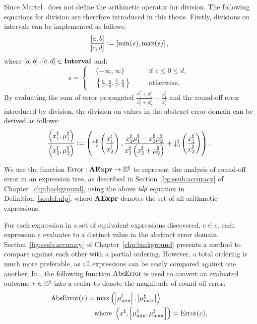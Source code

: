 Since Martel~\cite{martel07} does not define the arithmetic operator for
division.  The following equations for division are therefore introduced in
this thesis.  Firstly, divisions on intervals can be implemented as follows:
\begin{equation}
    \frac{\left[{a}, {b}\right]}{\left[{c}, {d}\right]}
        \vcentcolon= \left[{\min(s)}, {\max(s)}\right],
\end{equation}
where $\left[{a}, {b}\right], \left[{c}, {d}\right] \in \mathbf{Interval}$ and:
\begin{equation}
    s = \left\{
    \begin{aligned}
        & \{ -\infty, \infty \}
            && \text{if~} c \leq 0 \leq d, \\
        & \left\{
            \frac{a}{c}, \frac{a}{d}, \frac{b}{c}, \frac{b}{d}
        \right\}
            \quad && \text{otherwise}.
    \end{aligned}
    \right.
\end{equation}
By evaluating the sum of error propagated $\frac{ x^\sharp_1 + \mu^\sharp_1 }{
x^\sharp_2 + \mu^\sharp_2 } - \frac{x^\sharp_1}{x^\sharp_2}$ and the round-off
error introduced by division, the division on values in the abstract error
domain can be derived as follows:
\begin{equation}
    \frac{
        \left( x^\sharp_1, \mu^\sharp_1 \right)
    }{
        \left( x^\sharp_2, \mu^\sharp_2 \right)
    }
    \vcentcolon= \left(
            \operatorname{\uparrow^\sharp_\circ}\left(\frac{x^\sharp_1}{x^\sharp_2}\right),
            \frac{
                x^\sharp_2 \mu^\sharp_1 - x^\sharp_1 \mu^\sharp_2
            }{
                x^\sharp_1 \left( x^\sharp_2 + \mu^\sharp_2 \right)
            } + \operatorname{\downarrow^\sharp_\circ}\left(\frac{x^\sharp_1}{x^\sharp_2}\right)
        \right).
\end{equation}

We use the function $\operatorname{\mathrm{Error}}: \mathbf{AExpr}\to\mathbb{E}^\sharp$ to represent the
analysis of round-off error in an expression tree, as described in
Section~\ref{bg:ssub:accuracy} of Chapter~\ref{chp:background}, using the above
$\operatorname{\mathit{ulp}}$ equation in Definition~\ref{so:def:ulp}, where $\mathbf{AExpr}$ denotes the
set of all arithmetic expressions.

For each expression in a set of equivalent expressions discovered, $e \in
\epsilon$, each expression $e$ evaluates to a distinct value in the abstract
error domain.  Section~\ref{bg:ssub:accuracy} of Chapter~\ref{chp:background}
presents a method to compare against each other with a partial ordering.
However, a total ordering is much more preferable, as all expressions can
be easily compared against one another.  In \soap, the following function
$\operatorname{\mathrm{AbsError}}$ is used to convert an evaluated outcome $v \in \mathbb{E}^\sharp$ into a
scalar to denote the magnitude of round-off error:
\begin{equation}
    \begin{aligned}
        \operatorname{\mathrm{AbsError}}(e) &= \max\left(
            \left| \mu^\sharp_{\min} \right|,
            \left| \mu^\sharp_{\max} \right|
        \right) \\
        & \quad \text{where~}
        \left(
            x^\sharp, \left[ \mu^\sharp_{\min}, \mu^\sharp_{\max} \right]
        \right) = \operatorname{\mathrm{Error}}(e),
    \end{aligned}
    \label{so:eq:abserr}
\end{equation}

